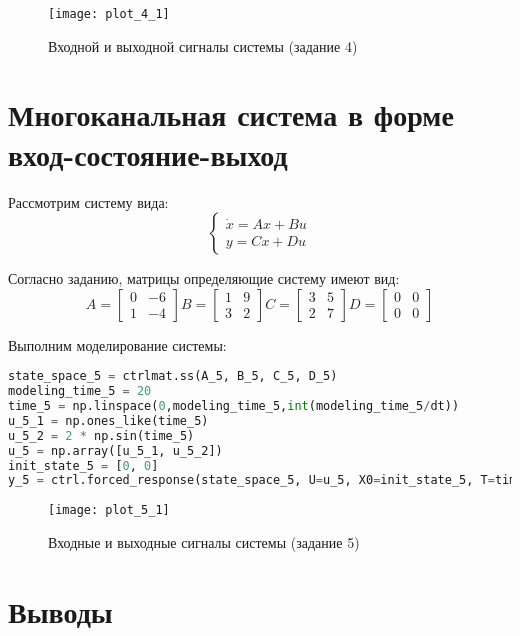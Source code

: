 \begin{figure}[h]
    \centering
    \texttt{[image: plot\_4\_1]}
    \caption{\label{fig:The-caption-1}Входной и выходной сигналы системы (задание 4)}
\end{figure}
\pagebreak

\section{Многоканальная система в форме вход-состояние-выход}
Рассмотрим систему вида:
\begin{equation}
    \begin{cases}
        \dot x = Ax + Bu \\
        y = Cx + Du
    \end{cases}
\end{equation}

Согласно заданию, матрицы определяющие систему имеют вид:
\begin{equation*}
    A = \begin{bmatrix}
        0 & -6   \\
        1 &  -4 
        \end{bmatrix}
        B = \begin{bmatrix}
            1 & 9  \\
            3 & 2
            \end{bmatrix}
        C = \begin{bmatrix}
            3 & 5 \\
            2 & 7 
            \end{bmatrix}
        D = \begin{bmatrix}
             0 & 0 \\
             0 & 0
            \end{bmatrix}
\end{equation*}

Выполним моделирование системы:
\begin{lstlisting}[language=Python]
state_space_5 = ctrlmat.ss(A_5, B_5, C_5, D_5)
modeling_time_5 = 20 
time_5 = np.linspace(0,modeling_time_5,int(modeling_time_5/dt))
u_5_1 = np.ones_like(time_5) 
u_5_2 = 2 * np.sin(time_5)
u_5 = np.array([u_5_1, u_5_2])
init_state_5 = [0, 0]
y_5 = ctrl.forced_response(state_space_5, U=u_5, X0=init_state_5, T=time_5).outputs
\end{lstlisting}

\begin{figure}[h]
    \centering
    \texttt{[image: plot\_5\_1]}
    \caption{\label{fig:The-caption-1}Входные и выходные сигналы системы (задание 5)}
\end{figure}
\pagebreak

\section{Выводы}
\pagebreak